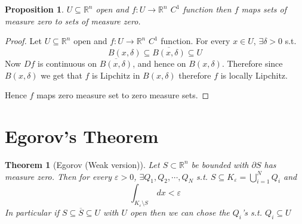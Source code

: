 \documentclass[11pt,openany]{book}
\theoremstyle{plain}
\newtheorem{theorem}{Theorem}[chapter]
\newtheorem{proposition}{Proposition}[chapter]
\theoremstyle{definition}
\theoremstyle{remark}
\newcommand{\R}{\mathbb{R}}
\begin{document}
\begin{proposition}
    $U \subseteq \R^n$ open and $f \colon U \to \R^n$ $C^1$ function then $f$ maps sets of measure zero to sets of measure zero. 
\end{proposition}

\begin{proof}
    Let $U \subseteq \R^n$ open and $f \colon U \to \R^n$ $C^1$ function. For every $x \in U$, $\exists \delta > 0$ s.t.
    $$B(x, \delta) \subseteq \overline{B(x, \delta)} \subseteq U$$
    Now $Df$ is continuous on $\overline{B(x,\delta)}$, and hence on $B(x,\delta)$. Therefore 
    since $B(x, \delta)$ we get that $f$ is Lipchitz in $B(x, \delta)$ therefore $f$ is locally Lipchitz. 
    
    Hence $f$ maps zero measure set to zero measure sets. 
\end{proof}

\section{Egorov's Theorem}

\begin{theorem}[Egorov (Weak version)]
    Let $S \subset \R^n$ be bounded with $\partial S$ has measure zero. Then for every $\varepsilon > 0$, $\exists Q_1, Q_2, \cdots, Q_N$ 
    s.t. $S \subseteq K_\varepsilon = \bigcup_{i=1}^N Q_i$ and 
    $$\int_{K_\varepsilon \setminus S} \ dx < \varepsilon$$ 
    In particular if $S \subseteq \overline{S} \subseteq U$ with $U$ open then we can chose the $Q_i$'s s.t. 
    $Q_i \subseteq U$
\end{theorem}
\end{document}
